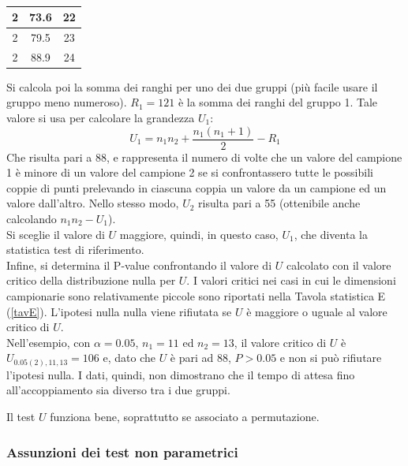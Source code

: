 \documentclass[10pt, draft]{book}
\newcounter{example}[section]
\begin{document}
\begin{example}
\begin{table}[H]
\begin{tabular}{c|c|c}
        \hline
        2 & \color{red}73.6 & \color{red}22\\
        \hline
        2 & \color{red}79.5 & \color{red}23\\
        \hline
        2 & \color{red}88.9 & \color{red}24\\
        \hline
        \end{tabular}
        \caption{\small{}}
        \label{tabgrilli2}
    \end{table}\noindent
    Si calcola poi la somma dei ranghi per uno dei due gruppi (più facile usare il gruppo meno numeroso). $R_1 = 121$ è la somma dei ranghi del gruppo 1. Tale valore si usa per calcolare la grandezza $U_1$:
    \begin{equation}
        U_1 = n_1n_2 + \frac{n_1(n_1+1)}{2}-R_1
    \end{equation}
    Che risulta pari a 88, e rappresenta il numero di volte che un valore del campione 1 è minore di un valore del campione 2 se si confrontassero tutte le possibili coppie di punti prelevando in ciascuna coppia un valore da un campione ed un valore dall'altro. Nello stesso modo, $U_2$ risulta pari a 55 (ottenibile anche calcolando $n_1n_2 - U_1$).\\
    Si sceglie il valore di $U$ maggiore, quindi, in questo caso, $U_1$, che diventa la statistica test di riferimento.\\
    Infine, si determina il P-value confrontando il valore di $U$ calcolato con il valore critico della distribuzione nulla per $U$. I valori critici nei casi in cui le dimensioni campionarie sono relativamente piccole sono riportati nella Tavola statistica E (\ref{tavE}). L'ipotesi nulla nulla viene rifiutata se $U$ è maggiore o uguale al valore critico di $U$.\\
    Nell'esempio, con $\alpha = 0.05$, $n_1 = 11$ ed $n_2 = 13$, il valore critico di $U$ è $U_{0.05(2),11,13} = 106$ e, dato che $U$ è pari ad 88, $P>0.05$ e non si può rifiutare l'ipotesi nulla. I dati, quindi, non dimostrano che il tempo di attesa fino all'accoppiamento sia diverso tra i due gruppi.
\end{example}

Il test $U$ funziona bene, soprattutto se associato a permutazione.

\subsubsection{Assunzioni dei test non parametrici}
\end{document}
